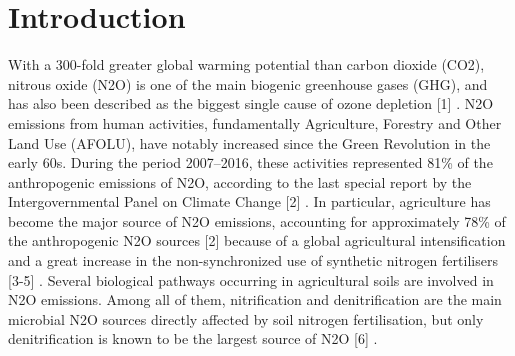 \documentclass[12pt]{article}
\begin{document}
\section{Introduction}
With a 300-fold greater global warming potential than carbon dioxide (CO2), nitrous
oxide (N2O) is one of the main biogenic greenhouse gases (GHG), and has also been
described as the biggest single cause of ozone depletion [1] \cite{ravishankara2009nitrous}. N2O emissions from human
activities, fundamentally Agriculture, Forestry and Other Land Use (AFOLU), have notably
increased since the Green Revolution in the early 60s. During the period 2007–2016,
these activities represented 81\% of the anthropogenic emissions of N2O, according to the
last special report by the Intergovernmental Panel on Climate Change [2] \cite{shukla2019climate}. In particular,
agriculture has become the major source of N2O emissions, accounting for approximately
78\% of the anthropogenic N2O sources [2] \cite{shukla2019climate} because of a global agricultural intensification
and a great increase in the non-synchronized use of synthetic nitrogen fertilisers [3-5] \cite{galloway2003nitrogen}\cite{richardson2009mitigating}\cite{taylor2010stoichiometric}.
Several biological pathways occurring in agricultural soils are involved in N2O emissions.
Among all of them, nitrification and denitrification are the main microbial N2O sources directly affected by soil nitrogen fertilisation, but only denitrification is known to be the
largest source of N2O [6] \cite{thomson2012biological}.
\end{document}
